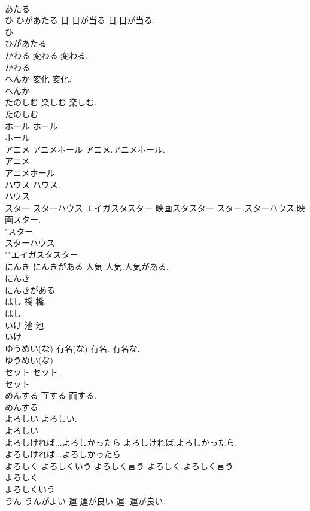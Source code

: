 \documentclass[8pt]{extreport}
\begin{document}
\begin{CJK}{UTF8}{min}
\\	あたる
\\	ひ ひがあたる	日 日が当る	日.日が当る.	
\\	ひ
\\	ひがあたる
\\	かわる	変わる	変わる.	
\\	かわる
\\	へんか	変化	変化.	
\\	へんか
\\	たのしむ	楽しむ	楽しむ.	
\\	たのしむ
\\	ホール		ホール.	
\\	ホール
\\	アニメ アニメホール		アニメ.アニメホール.	
\\	アニメ
\\	アニメホール
\\	ハウス		ハウス.	
\\	ハウス
\\	スター スターハウス エイガスタスター	映画スタスター	スター.スターハウス.映画スター.	
\\	"スター
\\	スターハウス
\\	""エイガスタスター
\\	にんき にんきがある	人気	人気.人気がある.	
\\	にんき
\\	にんきがある
\\	はし	橋	橋.	
\\	はし
\\	いけ	池	池.	
\\	いけ
\\	ゆうめい(な)	有名(な)	有名. 有名な.	
\\	ゆうめい(な)
\\	セット		セット.	
\\	セット
\\	めんする	面する	面する.	
\\	めんする
\\	よろしい		よろしい.	
\\	よろしい
\\	よろしければ...よろしかったら		よろしければ.よろしかったら.	
\\	よろしければ...よろしかったら
\\	よろしく よろしくいう	よろしく言う	よろしく.よろしく言う.	
\\	よろしく
\\	よろしくいう
\\	うん うんがよい	運 運が良い	運. 運が良い.	

\end{CJK}
\end{document}
